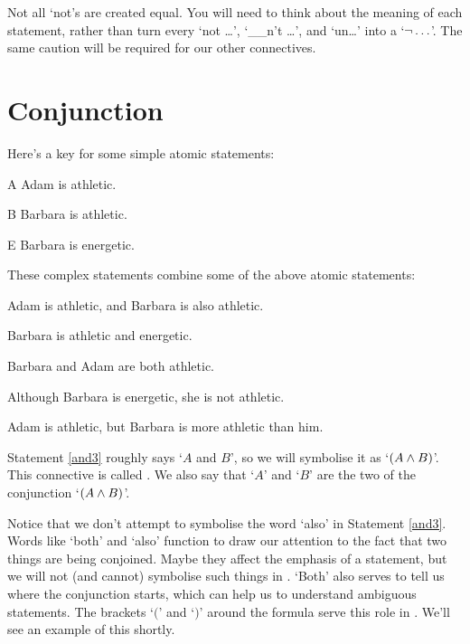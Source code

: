 \documentclass[PHIL101-Textbook.tex]{subfiles}
\begin{document}
 Not all `not's are created equal. You will need to think about the meaning of each statement, rather than turn every `not \ldots', `\_\_n't \ldots', and `un\ldots' into a `$\neg\ldots$'. The same caution will be required for our other connectives.
	

\section{Conjunction}
\label{s:ConnectiveConjunction}

Here's a key for some simple atomic statements:
	\begin{ekey}
		\item[A] Adam is athletic.
		\item[B] Barbara is athletic.
		\item[E] Barbara is energetic.
	\end{ekey}

\noindent These complex statements combine some of the above atomic statements:
	\begin{earg}
		\item[\ex{and3}]Adam is athletic, and Barbara is also athletic.
		\item[\ex{and4}]Barbara is athletic and energetic.
\item[\ex{and5}]Barbara and Adam are both athletic.
\item[\ex{and6}]Although Barbara is energetic, she is not athletic.
\item[\ex{and7}]Adam is athletic, but Barbara is more athletic than him.
	\end{earg}
Statement \ref{and3} roughly says `$A$ and $B$', so we will symbolise it as `$(A\land B)$'. This connective is called . We also say that `$A$' and `$B$' are the two  of the conjunction `$(A \land B)$'.

	
Notice that we don't attempt to symbolise the word `also' in Statement \ref{and3}. Words like `both' and `also' function to draw our attention to the fact that two things are being conjoined. Maybe they affect the emphasis of a statement, but we will not (and cannot) symbolise such things in \tfl. `Both' also serves to tell us where the conjunction starts, which can help us to understand ambiguous statements. The brackets `$($' and `$)$' around the formula serve this role in \tfl. We'll see an example of this shortly.
\end{document}

